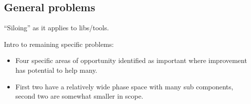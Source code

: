 \subsection{General problems}

``Siloing'' as it applies to libs/tools.

Intro to remaining specific problems:

\begin{itemize}
\item Four specific areas of opportunity identified as important where improvement has potential to help many.
\item First two have a relatively wide phase space with many sub components, second two are somewhat smaller in scope.
\end{itemize}
